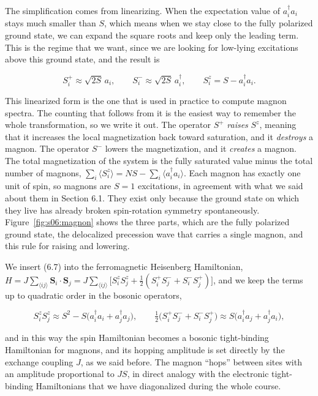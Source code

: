 The simplification comes from linearizing. When the expectation value of $a_i^\dagger a_i$ stays much
smaller than $S$, which means when we stay close to the fully polarized ground state, we can expand
the square roots and keep only the leading term. This is the regime that we want, since we are looking
for low-lying excitations above this ground state, and the result is

\begin{equation}
S_i^+ \approx \sqrt{2S}\, a_i, \qquad S_i^- \approx \sqrt{2S}\, a_i^\dagger, \qquad S_i^z = S - a_i^\dagger a_i.
\end{equation}

This linearized form is the one that is used in practice to compute magnon spectra. The counting that
follows from it is the easiest way to remember the whole transformation, so we write it out. The
operator $S^+$ \emph{raises} $S^z$, meaning that it increases the local magnetization back toward
saturation, and it \emph{destroys} a magnon. The operator $S^-$ lowers the magnetization, and it
\emph{creates} a magnon. The total magnetization of the system is the fully saturated value minus the
total number of magnons, $\sum_i \langle S_i^z\rangle = NS - \sum_i\langle a_i^\dagger a_i\rangle$.
Each magnon has exactly one unit of spin, so magnons are $S=1$ excitations, in agreement with what we
said about them in Section 6.1. They exist only because the ground state on which they live has
already broken spin-rotation symmetry spontaneously. Figure~\ref{fig:s06:magnon} shows the three
parts, which are the fully polarized ground state, the delocalized precession wave that carries a
single magnon, and this rule for raising and lowering.



We insert (6.7) into the ferromagnetic Heisenberg Hamiltonian, $H = J\sum_{\langle ij\rangle}
\mathbf S_i\cdot\mathbf S_j = J\sum_{\langle ij\rangle}\big[S_i^zS_j^z + \tfrac12(S_i^+S_j^-+S_i^-S_j^+)\big]$,
and we keep the terms up to quadratic order in the bosonic operators,

\begin{equation*}
S_i^zS_j^z \approx S^2 - S\big(a_i^\dagger a_i + a_j^\dagger a_j\big), \qquad
\tfrac12\big(S_i^+S_j^- + S_i^-S_j^+\big) \approx S\big(a_i^\dagger a_j + a_j^\dagger a_i\big),
\end{equation*}

and in this way the spin Hamiltonian becomes a bosonic tight-binding Hamiltonian for magnons, and its
hopping amplitude is set directly by the exchange coupling $J$, as we said before. The magnon ``hops''
between sites with an amplitude proportional to $JS$, in direct analogy with the electronic
tight-binding Hamiltonians that we have diagonalized during the whole course.

